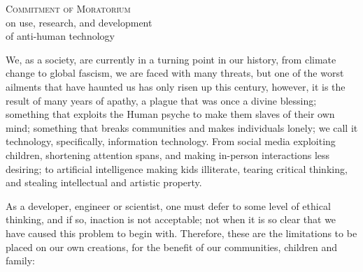 \documentclass[a4paper,11pt]{article}
\begin{document}
\pagestyle{fancy}
\fancyhead{}
\fancyfoot{}

\begin{spacing}{0.8}%
  \centering\LARGE%
  \textsc{Commitment of Moratorium}\\
  \Large%
  on use, research, and development\\of anti-human technology
  \vspace{5mm}
\end{spacing}

\noindent%
We, as a society, are currently in a turning point in our history, from climate change to global fascism, we are faced with many threats, but one of the worst ailments that have haunted us has only risen up this century, however, it is the result of many years of apathy, a plague that was once a divine blessing; something that exploits the Human psyche to make them slaves of their own mind; something that breaks communities and makes individuals lonely; we call it technology, specifically, information technology. From social media exploiting children, shortening attention spans, and making in-person interactions less desiring; to artificial intelligence making kids illiterate, tearing critical thinking, and stealing intellectual and artistic property.

As a developer, engineer or scientist, one must defer to some level of ethical thinking, and if so, inaction is not acceptable; not when it is so clear that we have caused this problem to begin with. Therefore, these are the limitations to be placed on our own creations, for the benefit of our communities, children and family:
\end{document}
